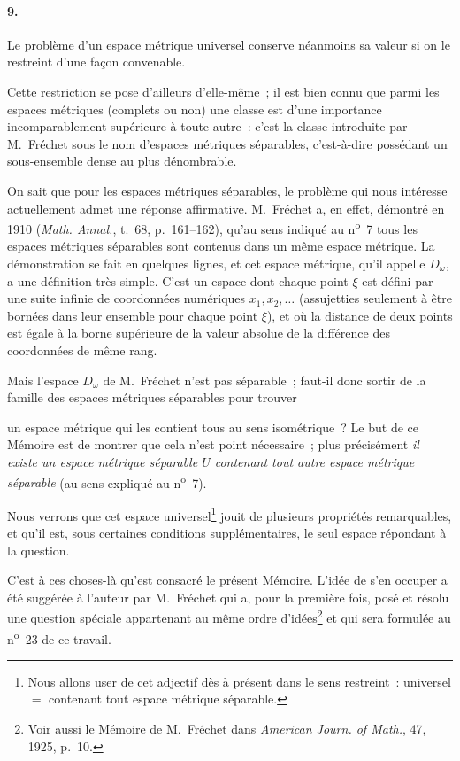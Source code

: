 \documentclass[a4paper,12pt]{amsart}
\newcommand{\srcpage}[1]{} %
\begin{document}
\paragraph{9.}
Le problème d'un espace métrique universel conserve néanmoins sa valeur si on le restreint d'une façon convenable.

Cette restriction se pose d'ailleurs d'elle-même~; il est bien connu que parmi les espaces métriques (complets ou non) une classe est d'une importance incomparablement supérieure à toute autre~: c'est la classe introduite par M.~Fréchet sous le nom d'espaces métriques séparables, c'est-à-dire possédant un sous-ensemble dense au plus dénombrable.

On sait que pour les espaces métriques séparables, le problème qui nous intéresse actuellement admet une réponse affirmative. M.~Fréchet a, en effet, démontré en 1910 (\textit{Math. Annal.}, t.~68, p.~161--162), qu'au sens indiqué au n\textsuperscript{o}~7 tous les espaces métriques séparables sont contenus dans un même espace métrique. La démonstration se fait en quelques lignes, et cet espace métrique, qu'il appelle $D_\omega$, a une définition très simple. C'est un espace dont chaque point $\xi$ est défini par une suite infinie de coordonnées numériques $x_1,x_2,\dots$ (assujetties seulement à être bornées dans leur ensemble pour chaque point $\xi$), et où la distance de deux points est égale à la borne supérieure de la valeur absolue de la différence des coordonnées de même rang.

Mais l'espace $D_\omega$ de M.~Fréchet n'est pas séparable~; faut-il donc sortir de la famille des espaces métriques séparables pour trouver
\srcpage{52}
un espace métrique qui les contient tous au sens isométrique~? Le but de ce Mémoire est de montrer que cela n'est point nécessaire~; plus précisément \textit{il existe un espace métrique séparable $U$ contenant tout autre espace métrique séparable} (au sens expliqué au n\textsuperscript{o}~7).

Nous verrons que cet espace universel\footnote{Nous allons user de cet adjectif dès à présent dans le sens restreint~: universel $=$ contenant tout espace métrique séparable.}
jouit de plusieurs propriétés remarquables, et qu'il est, sous certaines conditions supplémentaires, le seul espace répondant à la question.

C'est à ces choses-là qu'est consacré le présent Mémoire. L'idée de s'en occuper a été suggérée à l'auteur par M.~Fréchet qui a, pour la première fois, posé et résolu une question spéciale appartenant au même ordre d'idées\footnote{Voir aussi le Mémoire de M.~Fréchet dans \textit{American Journ. of Math.}, 47, 1925, p.~10.}
et qui sera formulée au n\textsuperscript{o}~23 de ce travail.
\end{document}
